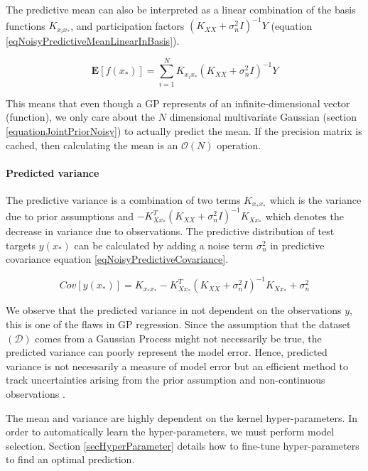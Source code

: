 The predictive mean can also be interpreted as a linear combination of the basis functions \(K_{x_{i}x_{*}}\), and participation factors \(( K_{XX} + \sigma^{2}_{n}I)^{-1}Y\) (equation \ref{eqNoisyPredictiveMeanLinearInBasis}). 

  \begin{equation}\label{eqNoisyPredictiveMeanLinearInBasis}
  \mathbf{E}[f(x_{*})] = \sum_{i = 1}^{N} K_{x_{i}x_{*}}( K_{XX} + \sigma^{2}_{n}I)^{-1}Y
  \end{equation}
  
This means that even though a GP represents of an infinite-dimensional vector (function), we only care about the \(N\) dimensional multivariate Gaussian (section \ref{equationJointPriorNoisy}) to actually predict the mean. If the precision matrix is cached, then calculating the mean is an \(\mathcal{O}\left ( N \right )\) operation.

\paragraph{Predicted variance}
The predictive variance is a combination of two terms \(K_{x_{*}x_{*}}\) which is the variance due to prior assumptions and \(- K_{Xx_{*}}^{T}( K_{XX} + \sigma^{2}_{n}I )^{-1} K_{Xx_{*}}\) which denotes the decrease in variance due to observations. The predictive distribution of test targets \(y(x_{*})\) can be calculated by adding a noise term \(\sigma^{2}_{n}\) in predictive covariance equation \ref{eqNoisyPredictiveCovariance}. 

  \begin{equation}\label{eqNoisyPredictiveCovarianceOnNoisyTarget}
	Cov[y(x_{*})] = K_{x_{*}x_{*}} - K_{Xx_{*}}^{T}( K_{XX} + \sigma^{2}_{n}I )^{-1} K_{Xx_{*}} + \sigma_{n}^{2}
  \end{equation}
  
We observe that the predicted variance in not dependent on the observations \(y\), this is one of the flaws in GP regression. Since the assumption that the dataset \((\mathcal{D})\) comes from a Gaussian Process might not necessarily be true, the predicted variance can poorly represent the model error. Hence, predicted variance is not necessarily a measure of model error but an efficient method to track uncertainties arising from the prior assumption and non-continuous observations \cite{shah2014student}.

The mean and variance are highly dependent on the kernel hyper-parameters. In order to automatically learn the hyper-parameters, we must perform model selection. Section \ref{secHyperParameter} details how to fine-tune hyper-parameters to find an optimal prediction.

